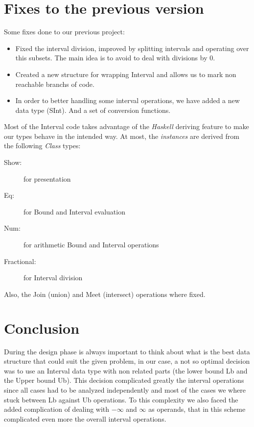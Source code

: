 \documentclass{article}
\begin{document}
\section{Fixes to the previous version}
Some fixes done to our previous project:

\begin{itemize}
  \item  Fixed the interval division, improved by splitting intervals and operating over this subsets. The main idea is to avoid to deal with divisions by 0.

  \item  Created a new structure for wrapping Interval and allows us to mark non reachable branchs of code.
  \item  In order to better handling some interval operations, we have added a new data type (SInt). And a set of conversion functions.
\end{itemize}

Most of the Interval code takes advantage of the \emph{Haskell} deriving feature to make our types behave in the intended way. At most, the \emph{instances} are derived from the following \emph{Class} types:

\begin{description}
  \item[Show:] for presentation
  \item[Eq:] for Bound and Interval evaluation
  \item[Num:] for arithmetic Bound and Interval operations
  \item[Fractional:] for Interval division

\end{description}
  
Also, the Join (union) and Meet (intersect) operations where fixed.


\section{Conclusion}

During the design phase is always important to think about what is the best data structure that could suit the given problem, in our case, a not so optimal decision was to use an Interval data type with non related parts (the lower bound Lb and the Upper bound Ub). This decision complicated greatly the interval operations since all cases had to be analyzed independently and most of the cases we where stuck between Lb against Ub operations. To this complexity we also faced the added complication of dealing with $-\infty$  and $\infty$ as operands, that in this scheme complicated even more the overall interval operations.
\end{document}
